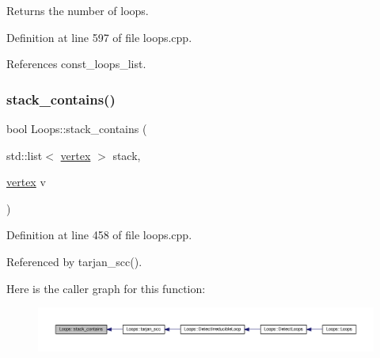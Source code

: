 Returns the number of loops. 



Definition at line 597 of file loops.\+cpp.



References const\+\_\+loops\+\_\+list.

\mbox{\label{classLoops_a695381637512bc8e48b578cc27137adb}} 
\subsubsection{\texorpdfstring{stack\+\_\+contains()}{stack\_contains()}}
{\footnotesize\ttfamily bool Loops\+::stack\+\_\+contains (\begin{DoxyParamCaption}\item[{std\+::list$<$ \hyperlink{graph_8hpp_abefdcf0544e601805af44eca032cca14}{vertex} $>$}]{stack,  }\item[{\hyperlink{graph_8hpp_abefdcf0544e601805af44eca032cca14}{vertex}}]{v }\end{DoxyParamCaption})\hspace{0.3cm}{\ttfamily [private]}}



Definition at line 458 of file loops.\+cpp.



Referenced by tarjan\+\_\+scc().

Here is the caller graph for this function\+:
\nopagebreak
\begin{figure}[H]
\begin{center}
\leavevmode
\includegraphics[width=350pt]{d3/ded/classLoops_a695381637512bc8e48b578cc27137adb_icgraph}
\end{center}
\end{figure}
\mbox{\label{classLoops_ae9b35d5e7f808751d95c7dc05e18c7a4}} 
